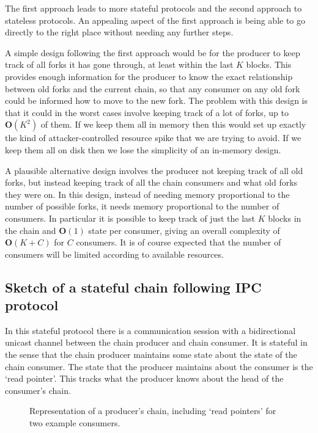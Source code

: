 \documentclass{article}
\theoremstyle{definition}{
  \newtheorem{lemma}{Lemma}[section] %
  \newtheorem{definition}[lemma]{Definition}
}
\theoremstyle{theorem}{
  \newtheorem{invariant}[lemma]{Invariant}
  \newtheorem{proofobligation}[lemma]{Proof Obligation}
}
\numberwithin{equation}{lemma}
\begin{document}
The first approach leads to more stateful protocols and the second approach to
stateless protocols. An appealing aspect of the first approach is being able to
go directly to the right place without needing any further steps.

A simple design following the first approach would be for the producer to keep
track of all forks it has gone through, at least within the last $K$ blocks.
This provides enough information for the producer to know the exact relationship
between old forks and the current chain, so that any consumer on any old fork
could be informed how to move to the new fork. The problem with this design is
that it could in the worst cases involve keeping track of a lot of forks, up to
$\mathbf{O}(K^2)$ of them. If we keep them all in memory then this would set up
exactly the kind of attacker-controlled resource spike that we are trying to
avoid. If we keep them all on disk then we lose the simplicity of an in-memory
design.

A plausible alternative design involves the producer not keeping track of all
old forks, but instead keeping track of all the chain consumers and what old
forks they were on. In this design, instead of needing memory proportional to
the number of possible forks, it needs memory proportional to the number of
consumers. In particular it is possible to keep track of just the last $K$
blocks in the chain and $\mathbf{O}(1)$ state per consumer, giving an overall
complexity of $\mathbf{O}(K + C)$ for $C$ consumers. It is of course expected
that the number of consumers will be limited according to available resources.

\subsection{Sketch of a stateful chain following IPC protocol}
\label{sec:stateful-ipc}

In this stateful protocol there is a communication session with a bidirectional
unicast channel between the chain producer and chain consumer. It is stateful
in the sense that the chain producer maintains some state about the state of
the chain consumer. The state that the producer maintains about the consumer
is the `read pointer'. This tracks what the producer knows about the head of
the consumer's chain.

\begin{figure}
\begin{center}
\end{center}
\caption{Representation of a producer's chain, including `read pointers' for two example consumers.}
\label{chain-diagram-read-pointers}
\end{figure}
\end{document}
